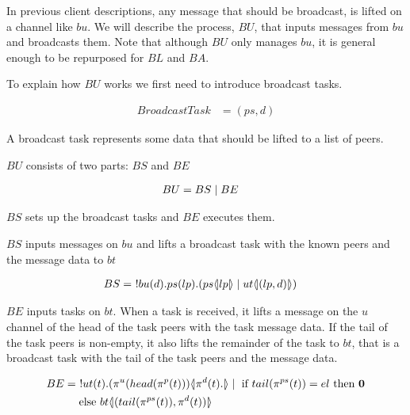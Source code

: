 In previous client descriptions, any message that should be broadcast, is lifted on a channel like $bu$.
We will describe the process, $BU$, that inputs messages from $bu$ and broadcasts them.
Note that although $BU$ only manages $bu$, it is general enough to be repurposed for $BL$ and $BA$.

To explain how $BU$ works we first need to introduce broadcast tasks.

\begin{align*}
    BroadcastTask &= (ps, d)
\end{align*}

A broadcast task represents some data that should be lifted to a list of peers.

$BU$ consists of two parts: $BS$ and $BE$

\begin{align*}
    BU &= BS \mid BE
\end{align*}

$BS$ sets up the broadcast tasks and $BE$ executes them.

$BS$ inputs messages on $bu$ and lifts a broadcast task with the known peers and the message data to $bt$

\begin{align*}
    BS &=\ !bu(d). ps(lp). (ps \langle \! | lp | \! \rangle \mid ut \langle \! | (lp,d) | \! \rangle)
\end{align*}

$BE$ inputs tasks on $bt$.
When a task is received, it lifts a message on the $u$ channel of the head of the task peers with the task message data.
If the tail of the task peers is non-empty, it also lifts the remainder of the task to $bt$, that is a broadcast task with the tail of the task peers and the message data.

\begin{align*}
    BE &=\ !ut(t). (\pi^{u}(head(\pi^{p}(t))) \langle \! | \pi^{d}(t). | \! \rangle \mid \text{ if }tail(\pi^{ps}(t))=el\text{ then }\mathbf{0}\\
    &\quad\text{ else }bt \langle \! | (tail(\pi^{ps}(t)),\pi^{d}(t)) | \! \rangle
\end{align*}
